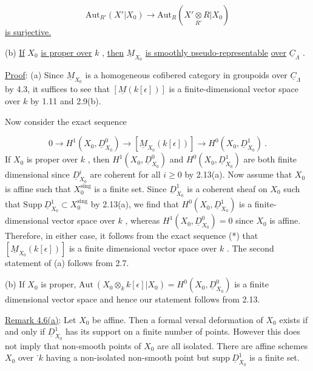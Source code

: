 \begin{equation*}
\mathrm{Aut}_{R'}(X'|X_{0}) \to \mathrm{Aut}_{R}(X' \underset{R'}{\otimes} R|X_{0})
\end{equation*}
\underline{is surjective.}

(b)  \underline{If}  $X_{0}$  \underline{is proper over}  $k$ , \underline{then}  $\underline{M}_{X_{0}}$  \underline{is smoothly pseudo-representable}
\underline{over} $\underline{C}_{\Lambda}$ .

\underline{Proof}:  (a)  Since  $\underline{M}_{X_{0}}$  is a homogeneous cofibered category in groupoids over $\underline{C}_{\Lambda}$ by 4.3, it suffices to see that  $[\underline{M}(k[\epsilon])]$  is a finite-dimensional vector space over  $k$  by 1.11 and 2.9(b).

Now consider the exact sequence

\begin{equation}\tag{*}
0 \to H^{1}(X_{0}, \underline{D}^{0}_{X_{0}}) \to [\underline{M}_{X_{0}}(k[\epsilon])] \to H^{0}(X_{0}, \underline{D}^{1}_{X_{0}}) \ .
\end{equation}
If  $X_{0}$  is proper over  $k$  , then  $H^{1}(X_{0}, \underline{D}^{0}_{X_{0}})$  and  $H^{0}(X_{0}, \underline{D}^{1}_{X_{0}})$  are both finite dimensional since  $\underline{D}^{i}_{X_{0}}$  are coherent for all  $i \geq 0$  by 2.13(a). Now assume that $X_{0}$  is affine such that  $X_{0}^{\mathrm{sing}}$  is a finite set. Since  $\underline{D}^{1}_{X_{0}}$  is a coherent sheaf on  $X_{0}$  such that  $\mathrm{Supp}\ \underline{D}^{1}_{X_{0}} \subset X_{0}^{\mathrm{sing}}$  by 2.13(a), we find that  $H^{0}(X_{0}, \underline{D}^{1}_{X_{0}})$  is a finite-dimensional vector space over  $k$  , whereas  $H^{1}(X_{0}, \underline{D}^{0}_{X_{0}}) = 0$  since  $X_{0}$ is affine. Therefore, in either case, it follows from the exact sequence (*) that $[\underline{M}_{X_{0}}(k[\epsilon])]$  is a finite dimensional vector space over  $k$  . The second statement of (a) follows from 2.7.

          (b)  If  $X_{0}$  is proper,  $\mathrm{Aut}\ (X_{0} \otimes_{k} k[\epsilon]|X_{0}) = H^{0}(X_{0}, \underline{D}^{0}_{X_{0}})$  is a finite dimensional vector space and hence our statement follows from 2.13.

\underline{Remark 4.6(a)}:  Let  $X_{0}$  be affine. Then a formal versal deformation of  $X_{0}$ exists if and only if  $\underline{D}^{1}_{X_{0}}$  has its support on a finite number of points. However this does not imply that non-smooth points of  $X_{0}$  are all isolated. There are affine schemes  $X_{0}$  over ˙$k$  having a non-isolated non-smooth point but  $\mathrm{supp}\ \underline{D}^{1}_{X_{0}}$ is a finite set.

